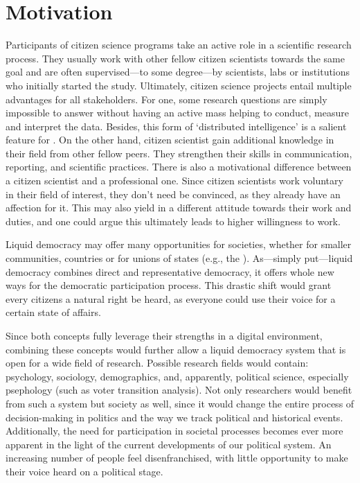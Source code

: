 \section{Motivation}
\label{sec:Motivation}

Participants of citizen science programs take an active role in a scientific research process. They usually work with other fellow citizen scientists towards the same goal and are often supervised---to some degree---by scientists, labs or institutions who initially started the study. Ultimately, citizen science projects entail multiple advantages for all stakeholders. For one, some research questions are simply impossible to answer without having an active mass helping to conduct, measure and interpret the data. Besides, this form of ‘distributed intelligence’ is a salient feature for . On the other hand, citizen scientist gain additional knowledge in their field from other fellow peers. They strengthen their skills in communication, reporting, and scientific practices. There is also a motivational difference between a citizen scientist and a professional one. Since citizen scientists work voluntary in their field of interest, they don’t need be convinced, as they already have an affection for it. This may also yield in a different attitude towards their work and duties, and one could argue this ultimately leads to higher willingness to work.

Liquid democracy may offer many opportunities for societies, whether for smaller communities, countries or for unions of states (e.g., the ). As---simply put---liquid democracy combines direct and representative democracy, it offers whole new ways for the democratic participation process. This drastic shift would grant every citizens a natural right be heard, as everyone could use their voice for a certain state of affairs.

Since both concepts fully leverage their strengths in a digital environment, combining these concepts would further allow a liquid democracy system that is open for a wide field of research. Possible research fields would contain: psychology, sociology, demographics, and, apparently, political science, especially psephology (such as voter transition analysis).  Not only researchers would benefit from such a system but society as well, since it would change the entire process of decision-making in politics and the way we track political and historical events. Additionally, the need for participation in societal processes becomes ever more apparent in the light of the current developments of our political system. An increasing number of people feel disenfranchised, with little opportunity to make their voice heard on a political stage.


